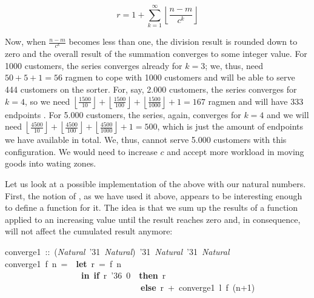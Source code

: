 \documentclass{scrreprt}
\newcommand{\texfamily}{\fontfamily{cmtex}\selectfont}
\begin{document}
\begin{equation}\label{eq3}
r = 1 + \sum_{k=1}^{\infty}{\left\lfloor\frac{n - m}{c^k}\right\rfloor}
\end{equation}

Now, when $\frac{n - m}{c^k}$ becomes less than one,
the division result is rounded down to zero
and the overall result of the summation
converges to some integer value.
For \num{1000} customers, the series converges already
for $k = 3$; we, thus, need $50 + 5 + 1 = 56$ ragmen to cope
with \num{1000} customers and
will be able to serve 444 customers on the sorter.
For, say, \num{2,000} customers, the series converges
for $k = 4$, so we need 
$\left\lfloor\frac{1500}{10}\right\rfloor   + 
 \left\lfloor\frac{1500}{100}\right\rfloor  + 
 \left\lfloor\frac{1500}{1000}\right\rfloor + 1 
 = 167$
ragmen and will have 333 endpoints .
For \num{5,000} customers, the series, again, converges
for $k = 4$ and we will need
$\left\lfloor\frac{4500}{10}\right\rfloor   + 
 \left\lfloor\frac{4500}{100}\right\rfloor  + 
 \left\lfloor\frac{4500}{1000}\right\rfloor + 1 
 = 500$,
which is just the amount of endpoints we have available in total.
We, thus, cannot serve \num{5,000} customers with 
this configuration. We would need to increase $c$
and accept more workload in moving
goods into wating zones.

Let us look at a possible implementation
of the above with our natural numbers.
First, the notion of ,
as we have used it above,
appears to be interesting enough to 
define a function for it. The idea is
that we sum up the results of 
a function applied to an increasing value
until the result reaches zero and, 
in consequence, will not affect the 
cumulated result anymore:


\begin{tabbing}\texfamily
converge1~::~({\itshape Natural}~\char'31~{\itshape Natural})~\char'31~{\itshape Natural}~\char'31~{\itshape Natural}\\
\texfamily converge1~f~n~=~~{\bfseries let}~r~=~f~n\\
\texfamily ~~~~~~~~~~~~~~~~~~{\bfseries in}~{\bfseries if}~r~\char'36~0~~{\bfseries then}~r\\
\texfamily ~~~~~~~~~~~~~~~~~~~~~~~~~~~~~~~~{\bfseries else}~r~+~converge1~l~f~(n+1)
\end{tabbing}
\end{document}
